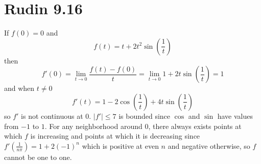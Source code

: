 \documentclass{article}
\begin{document}
\section*{Rudin 9.16}
If $f(0) = 0$ and
\[
  f(t) = t + 2t^2\sin\left(\frac{1}{t}\right)
\]
then 
\[
  f'(0) = \lim_{t\to 0}\frac{f(t) - f(0)}{t} = \lim_{t\to 0} 1 + 2t\sin\left(\frac{1}{t}\right) = 1
\]
and when $t \neq 0$
\[
  f'(t) = 1 - 2\cos\left(\frac{1}{t}\right) + 4t\sin\left(\frac{1}{t}\right)
\]
so $f'$ is not continuous at $0$.
$|f'| \leq 7$ is bounded since $\cos$ and $\sin$ have values from $-1$ to $1$.
For any neighborhood around $0$, there always exists points 
at which $f$ is increasing and points at which it is decreasing since 
$f'(\frac{1}{n\pi}) = 1+2(-1)^n$ which is positive at even $n$ and negative otherwise,
 so $f$ cannot be one to one.
\newpage 
\end{document}

